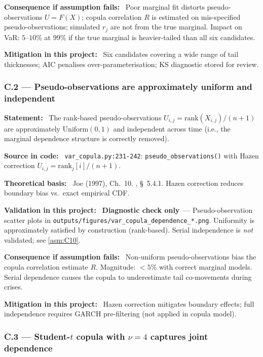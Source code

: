 \documentclass[11pt,a4paper]{article}
\newcommand{\asmfield}[1]{\medskip\noindent\textbf{#1:}\ }
\newcommand{\code}[1]{\texttt{#1}}
\newcommand{\diagnostic}{\textbf{Diagnostic check only}}
\begin{document}
\asmfield{Consequence if assumption fails}
Poor marginal fit distorts pseudo-observations $U = F(X)$; copula
correlation $R$ is estimated on mis-specified pseudo-observations; simulated
$r_j$ are not from the true marginal. Impact on VaR: $5$--$10\%$ at 99\%
if the true marginal is heavier-tailed than all six candidates.

\asmfield{Mitigation in this project}
Six candidates covering a wide range of tail thicknesses; AIC penalises
over-parameterisation; KS diagnostic stored for review.

\subsubsection{C.2 --- Pseudo-observations are approximately uniform and independent}\label{asm:C2}

\asmfield{Statement}
The rank-based pseudo-observations $U_{i,j} = \text{rank}(X_{i,j}) / (n+1)$
are approximately $\text{Uniform}(0,1)$ and independent across time
(i.e., the marginal dependence structure is correctly removed).

\asmfield{Source in code}
\code{var\_copula.py:231-242}: \code{pseudo\_observations()} with Hazen
correction $U_{i,j} = \text{rank}_j[i] / (n+1)$.

\asmfield{Theoretical basis}
Joe (1997), Ch.~10. \cite{McNeilFreyEmbrechts2005}, \S~5.4.1. Hazen
correction reduces boundary bias vs.\ exact empirical CDF.

\asmfield{Validation in this project}
\diagnostic\ --- Pseudo-observation scatter plots in
\code{outputs/figures/var\_copula\_dependence\_*.png}. Uniformity is
approximately satisfied by construction (rank-based). Serial independence
is \emph{not} validated; see \cref{asm:C10}.

\asmfield{Consequence if assumption fails}
Non-uniform pseudo-observations bias the copula correlation estimate $R$.
Magnitude: $< 5\%$ with correct marginal models. Serial dependence causes
the copula to underestimate tail co-movements during crises.

\asmfield{Mitigation in this project}
Hazen correction mitigates boundary effects; full independence requires
GARCH pre-filtering (not applied in copula model).

\subsubsection{C.3 --- Student-$t$ copula with $\nu = 4$ captures joint dependence}\label{asm:C3}
\end{document}
